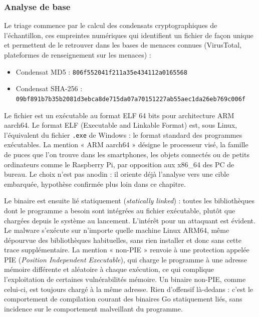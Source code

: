 \subsubsection{Analyse de base}

Le triage commence par le calcul des condensats cryptographiques de l'échantillon, ces empreintes numériques qui identifient un fichier de façon unique et permettent de le retrouver dans les bases de menaces connues (VirusTotal, plateformes de renseignement sur les menaces) :

\begin{itemize}
    \item Condensat MD5 : \texttt{806f5520\allowbreak41f211a3\allowbreak5e434112\allowbreak a0165568}
    \item Condensat SHA-256 : \texttt{09bf891b\allowbreak7b35b208\allowbreak1d3ebca8\allowbreak de715da0\allowbreak7a701512\allowbreak27ab55ae\allowbreak c1da26eb\allowbreak769c006f}
\end{itemize}

Le fichier est un exécutable au format ELF 64 bits pour architecture ARM aarch64. Le format ELF (Executable and Linkable Format) est, sous Linux, l'équivalent du fichier \texttt{.exe} de Windows : le format standard des programmes exécutables. La mention « ARM aarch64 » désigne le processeur visé, la famille de puces que l'on trouve dans les smartphones, les objets connectés ou de petits ordinateurs comme le Raspberry Pi, par opposition aux x86\_64 des PC de bureau. Le choix n'est pas anodin : il oriente déjà l'analyse vers une cible embarquée, hypothèse confirmée plus loin dans ce chapitre.

Le binaire est ensuite lié statiquement (\emph{statically linked}) : toutes les bibliothèques dont le programme a besoin sont intégrées au fichier exécutable, plutôt que chargées depuis le système au lancement. L'intérêt pour un attaquant est évident. Le malware s'exécute sur n'importe quelle machine Linux ARM64, même dépourvue des bibliothèques habituelles, sans rien installer et donc sans cette trace supplémentaire. La mention « non-PIE » renvoie à une protection appelée PIE (\emph{Position Independent Executable}), qui charge le programme à une adresse mémoire différente et aléatoire à chaque exécution, ce qui complique l'exploitation de certaines vulnérabilités mémoire. Un binaire non-PIE, comme celui-ci, est toujours chargé à la même adresse. Rien d'offensif là-dedans : c'est le comportement de compilation courant des binaires Go statiquement liés, sans incidence sur le comportement malveillant du programme.

